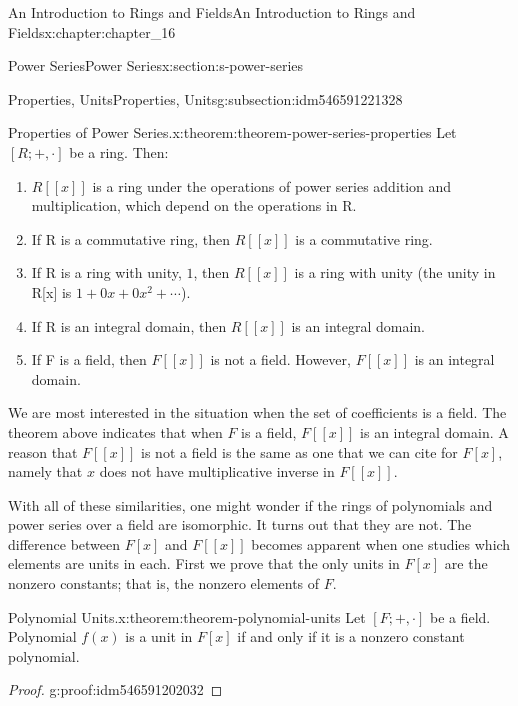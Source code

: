 \documentclass[oneside,10pt,]{book}
\newcommand{\forwardimplication}{($\Rightarrow$)}
\numberwithin{equation}{section}
\begin{document}
\begin{chapterptx}{An Introduction to Rings and Fields}{}{An Introduction to Rings and Fields}{}{}{x:chapter:chapter_16}
\begin{sectionptx}{Power Series}{}{Power Series}{}{}{x:section:s-power-series}
\begin{subsectionptx}{Properties, Units}{}{Properties, Units}{}{}{g:subsection:idm546591221328}
\begin{theorem}{Properties of Power Series.}{}{x:theorem:theorem-power-series-properties}%
Let \([R; +, \cdot ]\) be a ring. Then:%
\begin{enumerate}[label=(\arabic*)]
\item{}\(R[[x]]\) is a ring under the operations of power series addition and multiplication, which depend on  the operations in R.%
\item{}If R is a commutative ring, then \(R[[x]]\) is a commutative ring.%
\item{}If R is a ring with unity, \(1\), then \(R[[x]]\) is a ring with unity (the unity in R[x] is \(1 + 0x + 0 x^2 + \cdots\)).%
\item{}If R is an integral domain, then \(R[[x]]\) is an integral domain.%
\item{}If F is a field, then \(F[[x]]\) is not a field. However, \(F[[x]]\) is an integral domain.%
\end{enumerate}
%
\end{theorem}
We are most interested in the situation when the set of coefficients is a field. The theorem above indicates that when \(F\) is a field, \(F[[x]]\) is an integral domain. A reason that \(F[[x]]\) is not a field is the same as one that we can cite for \(F[x]\), namely that \(x\) does not have multiplicative inverse in \(F[[x]]\).%
\par
With all of these similarities, one might wonder if the rings of polynomials and power series over a field are isomorphic.  It turns out that they are not. The difference between \(F[x]\) and \(F[[x]]\) becomes apparent when one studies which elements are units in each. First we prove that the only units in \(F[x]\) are the nonzero constants; that is, the nonzero elements of \(F\).%
\begin{theorem}{Polynomial Units.}{}{x:theorem:theorem-polynomial-units}%
%
%
Let \([F; +, \cdot ]\) be a field. Polynomial \(f(x)\) is a unit in \(F[x]\) if and only if it is a nonzero constant polynomial.%
\end{theorem}
\begin{proof}{}{g:proof:idm546591202032}
\end{proof}
\end{subsectionptx}
\end{sectionptx}
\end{chapterptx}
\end{document}
